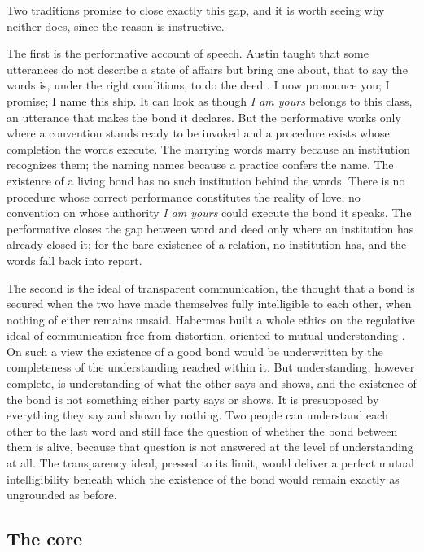 Two traditions promise to close exactly this gap, and it is worth seeing why neither does, since the reason is instructive.

The first is the performative account of speech. Austin taught that some utterances do not describe a state of affairs but bring one about, that to say the words is, under the right conditions, to do the deed \parencite{austin1962words}. I now pronounce you; I promise; I name this ship. It can look as though \emph{I am yours} belongs to this class, an utterance that makes the bond it declares. But the performative works only where a convention stands ready to be invoked and a procedure exists whose completion the words execute. The marrying words marry because an institution recognizes them; the naming names because a practice confers the name. The existence of a living bond has no such institution behind the words. There is no procedure whose correct performance constitutes the reality of love, no convention on whose authority \emph{I am yours} could execute the bond it speaks. The performative closes the gap between word and deed only where an institution has already closed it; for the bare existence of a relation, no institution has, and the words fall back into report.

The second is the ideal of transparent communication, the thought that a bond is secured when the two have made themselves fully intelligible to each other, when nothing of either remains unsaid. Habermas built a whole ethics on the regulative ideal of communication free from distortion, oriented to mutual understanding \parencite{habermas1984theory}. On such a view the existence of a good bond would be underwritten by the completeness of the understanding reached within it. But understanding, however complete, is understanding of what the other says and shows, and the existence of the bond is not something either party says or shows. It is presupposed by everything they say and shown by nothing. Two people can understand each other to the last word and still face the question of whether the bond between them is alive, because that question is not answered at the level of understanding at all. The transparency ideal, pressed to its limit, would deliver a perfect mutual intelligibility beneath which the existence of the bond would remain exactly as ungrounded as before.

\subsection*{The core}

